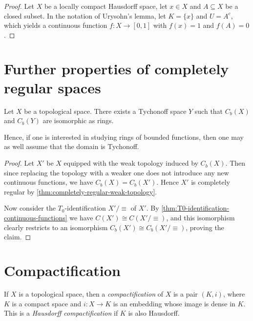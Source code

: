 \documentclass[article, a4paper, 11pt, oneside]{memoir}
\numberwithin{equation}{chapter}
\newcommand{\calT}{\mathcal{T}}
\begin{document}
\begin{proof}
    Let $X$ be a locally compact Hausdorff space, let $x \in X$ and $A \subseteq X$ be a closed subset. In the notation of Urysohn's lemma, let $K = \{x\}$ and $U = A^c$, which yields a continuous function $f \colon X \to [0,1]$ with $f(x) = 1$ and $f(A) = 0$.
\end{proof}


\section{Further properties of completely regular spaces}


\begin{proposition}
    Let $X$ be a topological space. There exists a Tychonoff space $Y$ such that $C_b(X)$ and $C_b(Y)$ are isomorphic as rings.
\end{proposition}
%
Hence, if one is interested in studying rings of bounded functions, then one may as well assume that the domain is Tychonoff.

\begin{proof}
    Let $X'$ be $X$ equipped with the weak topology induced by $C_b(X)$. Then since replacing the topology with a weaker one does not introduce any new continuous functions, we have $C_b(X) = C_b(X')$. Hence $X'$ is completely regular by \cref{thm:completely-regular-weak-topology}.

    Now consider the $T_0$-identification $X'/{\equiv}$ of $X'$. By \cref{thm:T0-identification-continuous-functions} we have $C(X') \cong C(X'/{\equiv})$, and this isomorphism clearly restricts to an isomorphism $C_b(X') \cong C_b(X'/{\equiv})$, proving the claim.
\end{proof}


\section{Compactification}

\newcommand{\catCHaus}{\mathbf{CHaus}}
\newcommand{\catTop}{\mathbf{Top}}
\newcommand{\catSet}{\mathbf{Set}}
\newcommand{\catGrp}{\mathbf{Grp}}

If $X$ is a topological space, then a \emph{compactification} of $X$ is a pair $(K,i)$, where $K$ is a compact space and $i \colon X \to K$ is an embedding whose image is dense in $K$. This is a \emph{Hausdorff compactification} if $K$ is also Hausdorff.
\end{document}
